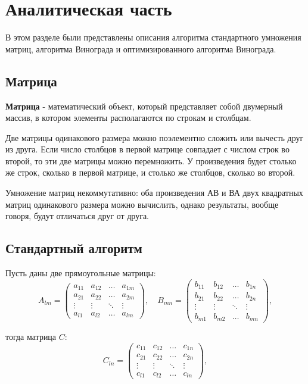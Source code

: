 \chapter{Аналитическая часть}
В этом разделе были представлены описания алгоритма стандартного умножения матриц, алгоритма Винограда и оптимизированного алгоритма Винограда.

\section{Матрица}

\textbf{Матрица} \cite{matrix} - математический объект, который представляет собой двумерный массив, в котором элементы располагаются по строкам и столбцам.

Две матрицы одинакового размера можно поэлементно сложить или вычесть друг из друга. Если число столбцов в первой матрице совпадает с числом строк во второй, то эти две матрицы можно перемножить. У произведения будет столько же строк, сколько в первой матрице, и столько же столбцов, сколько во второй. 

Умножение матриц некоммутативно: оба произведения АВ и ВА двух квадратных матриц одинакового размера можно вычислить, однако результаты, вообще говоря, будут отличаться друг от друга.

\section{Стандартный алгоритм}

Пусть даны две прямоугольные матрицы:
\begin{equation}
        \label{aaa}
	A_{lm} = \begin{pmatrix}
		a_{11} & a_{12} & \ldots & a_{1m}\\
		a_{21} & a_{22} & \ldots & a_{2m}\\
		\vdots & \vdots & \ddots & \vdots\\
		a_{l1} & a_{l2} & \ldots & a_{lm}
	\end{pmatrix},
	\quad
	B_{mn} = \begin{pmatrix}
		b_{11} & b_{12} & \ldots & b_{1n}\\
		b_{21} & b_{22} & \ldots & b_{2n}\\
		\vdots & \vdots & \ddots & \vdots\\
		b_{m1} & b_{m2} & \ldots & b_{mn}
	\end{pmatrix},
\end{equation}

тогда матрица $C$:
\begin{equation}
        \label{bbb}
	C_{ln} = \begin{pmatrix}
		c_{11} & c_{12} & \ldots & c_{1n}\\
		c_{21} & c_{22} & \ldots & c_{2n}\\
		\vdots & \vdots & \ddots & \vdots\\
		c_{l1} & c_{l2} & \ldots & c_{ln}
	\end{pmatrix},
\end{equation}

